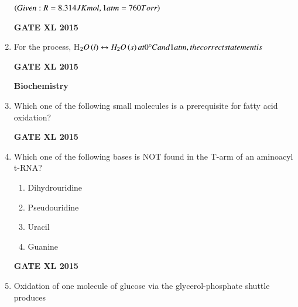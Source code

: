 \documentclass[journal,12pt,onecolumn]{IEEEtran}
\begin{document}
\begin{enumerate}
$\left(Given: R=8.314 JK mol, 1 atm = 760 Torr\right)$
\begin{flushright}\textbf{GATE XL 2015}\end{flushright}
\item For the process, H$_2O\left(l\right)\leftrightarrow H_2O\left(s\right) at 0\degree C and 1 atm, the correct statement is$
    \begin{enumerate}
    \end{enumerate}
\begin{flushright}\textbf{GATE XL 2015}\end{flushright}
	\textbf{Biochemistry}
\item Which one of the following small molecules is a prerequisite for fatty acid oxidation?
    \begin{enumerate}
    \end{enumerate}
\begin{flushright}\textbf{GATE XL 2015}\end{flushright}
\item Which one of the following bases is NOT found in the T-arm of an aminoacyl t-RNA?
    \begin{enumerate}
            \item Dihydrouridine
	    \item Pseudouridine
	    \item Uracil
            \item Guanine
    \end{enumerate}
\begin{flushright}\textbf{GATE XL 2015}\end{flushright}
\item Oxidation of one molecule of glucose via the glycerol-phosphate shuttle produces

\end{enumerate}
\end{document}
